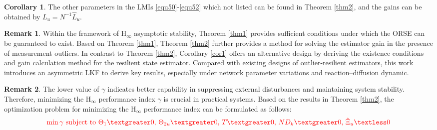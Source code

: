 \documentclass[preprint,review,fleqn,sort&compress,3p]{elsarticle}
\theoremstyle{definition}%
\newtheorem{cor}{Corollary}[section]
\newtheorem{rem}{Remark}[section]
\begin{document}
\begin{cor}
	The other parameters in the LMIs \eqref{equ50}-\eqref{equ52} which not listed can be found in Theorem \ref{thm2}, and the gains can be obtained by $L_u=N^{-1}\hat{L}_u$.
\end{cor}

\begin{rem}\label{rem7}
	Within the framework of $\text{H}_\infty$ asymptotic stability, Theorem \ref{thm1} provides sufficient conditions under which the ORSE can be guaranteed to exist. Based on Theorem \ref{thm1}, Theorem \ref{thm2} further provides a method for solving the estimator gain in the presence of measurement outliers. In contrast to Theorem \ref{thm2}, Corollary \ref{cor1} offers an alternative design by deriving the existence conditions and gain calculation method for the resilient state estimator. Compared with existing designs of outlier-resilient estimators, this work introduces an asymmetric LKF to derive key results, especially under network parameter variations and reaction–diffusion dynamic.
\end{rem}
\begin{rem}\label{rem8}
	{\color{red}The lower value of $\gamma$ indicates better capability in suppressing external disturbances and maintaining system stability. Therefore, minimizing the $\text{H}_\infty$ performance index $\gamma$ is crucial in practical systems. Based on the results in Theorem \ref{thm2}, the optimization problem for minimizing the $\text{H}_\infty$ performance index can be formulated as follows:}
	\begin{align}
		{\color{red} \min \gamma \ \text{subject to} \ \Theta_{1}\textgreater 0,\, \Theta_{2u} \textgreater 0,\,  T \textgreater 0,\,  N D_k \textgreater 0, \, \hat{\Xi}_u  \textless 0 }
	\end{align}
\end{rem}
\end{document}
